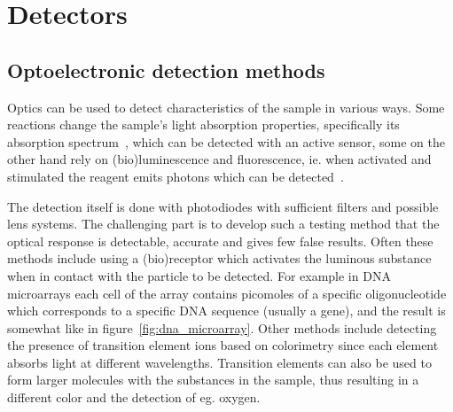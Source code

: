 \documentclass[12pt]{article}
\begin{document}
\section{Detectors}\label{section:detectors}

\subsection{Optoelectronic detection methods}
Optics can be used to detect characteristics of the sample in various ways. Some reactions
change the sample's light absorption properties, specifically its absorption spectrum~\cite{SUGINO_2009},
which can be detected with an active sensor, some on the other hand rely on (bio)luminescence
and fluorescence, ie. when activated and stimulated the reagent emits photons which can be detected~\cite{KAMEI_2008}.

The detection itself is done with photodiodes with sufficient filters and possible lens systems.
The challenging
part is to develop such a testing method that the optical response is detectable, accurate and
gives few false results. Often these methods include using a (bio)receptor which activates the
luminous substance when in contact with the particle to be detected. For example in DNA 
microarrays each cell of the array contains picomoles of a specific oligonucleotide which
corresponds to a specific DNA sequence (usually a gene), and the result is somewhat like in
figure~\ref{fig:dna_microarray}. Other methods include detecting the presence of transition 
element ions based on colorimetry since each element absorbs light at different wavelengths. 
Transition elements can also be used to form larger molecules with the substances in the sample, 
thus resulting in a different color and the detection of eg. oxygen.
\end{document}
